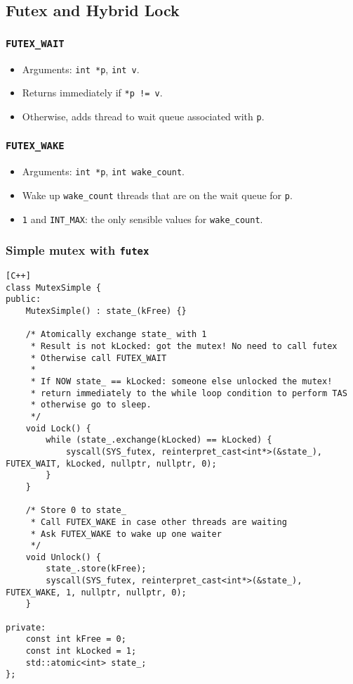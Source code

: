 \documentclass[twocolumn,landscape,10pt]{article}
\theoremstyle{definition}
\begin{document}
\subsection{Futex and Hybrid Lock}

\subsubsection{\texttt{FUTEX\_WAIT}}

\begin{itemize}
    \item Arguments: \texttt{int *p}, \texttt{int v}.
    \item Returns immediately if \texttt{*p != v}.
    \item Otherwise, adds thread to wait queue associated with \texttt{p}.
\end{itemize} 

\subsubsection{\texttt{FUTEX\_WAKE}}

\begin{itemize}
    \item Arguments: \texttt{int *p}, \texttt{int wake\_count}.
    \item Wake up \texttt{wake\_count} threads that are on the wait queue for
        \texttt{p}.
    \item \texttt{1} and \texttt{INT\_MAX}: the only sensible values for
        \texttt{wake\_count}.
\end{itemize} 

\subsubsection{Simple mutex with \texttt{futex}}

\begin{lstlisting}[C++]
class MutexSimple {
public:
    MutexSimple() : state_(kFree) {}

    /* Atomically exchange state_ with 1
     * Result is not kLocked: got the mutex! No need to call futex
     * Otherwise call FUTEX_WAIT
     *
     * If NOW state_ == kLocked: someone else unlocked the mutex!
     * return immediately to the while loop condition to perform TAS
     * otherwise go to sleep.
     */
    void Lock() {
        while (state_.exchange(kLocked) == kLocked) {
            syscall(SYS_futex, reinterpret_cast<int*>(&state_), FUTEX_WAIT, kLocked, nullptr, nullptr, 0);
        }
    }

    /* Store 0 to state_
     * Call FUTEX_WAKE in case other threads are waiting
     * Ask FUTEX_WAKE to wake up one waiter
     */
    void Unlock() {
        state_.store(kFree);
        syscall(SYS_futex, reinterpret_cast<int*>(&state_), FUTEX_WAKE, 1, nullptr, nullptr, 0);
    }

private:
    const int kFree = 0;
    const int kLocked = 1;
    std::atomic<int> state_;
};
\end{lstlisting} 
\end{document}
